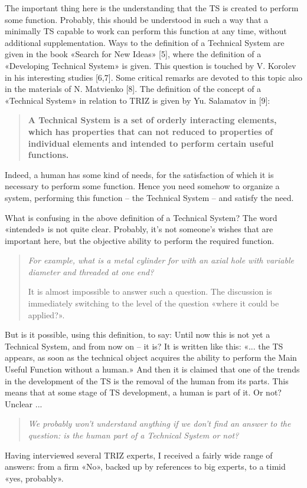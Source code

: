 \documentclass[11pt,a4paper]{article}
\begin{document}
The important thing here is the understanding that the TS is created to
perform some function. Probably, this should be understood in such a way that
a minimally TS capable to work can perform this function at any time, without
additional supplementation. Ways to the definition of a Technical System are
given in the book «Search for New Ideas» [5], where the definition of a
«Developing Technical System» is given. This question is touched by V. Korolev
in his interesting studies [6,7]. Some critical remarks are devoted to this
topic also in the materials of N. Matvienko [8]. The definition of the concept
of a «Technical System» in relation to TRIZ is given by Yu. Salamatov in [9]:
\begin{quote}\bf
  A Technical System is a set of orderly interacting elements, which has
  properties that can not reduced to properties of individual elements and
  intended to perform certain useful functions.
\end{quote}
Indeed, a human has some kind of needs, for the satisfaction of which it is
necessary to perform some function. Hence you need somehow to organize a
system, performing this function -- the Technical System -- and satisfy the
need.

What is confusing in the above definition of a Technical System? The word
«intended» is not quite clear. Probably, it's not someone's wishes that are
important here, but the objective ability to perform the required function.
\begin{quote}\it
  For example, what is a metal cylinder for with an axial hole with variable
  diameter and threaded at one end?

  It is almost impossible to answer such a question. The discussion is
  immediately switching to the level of the question «where it could be
  applied?».
\end{quote}
But is it possible, using this definition, to say: Until now this is not yet a
Technical System, and from now on -- it is? It is written like this: «... the
TS appears, as soon as the technical object acquires the ability to perform
the Main Useful Function without a human.» And then it is claimed that one of
the trends in the development of the TS is the removal of the human from its
parts.  This means that at some stage of TS development, a human is part of
it.  Or not? Unclear ...
\begin{quote}\it
  We probably won't understand anything if we don't find an answer to the
  question: is the human part of a Technical System or not?
\end{quote}
Having interviewed several TRIZ experts, I received a fairly wide range of
answers: from a firm «No», backed up by references to big experts, to a timid
«yes, probably».
\end{document}
